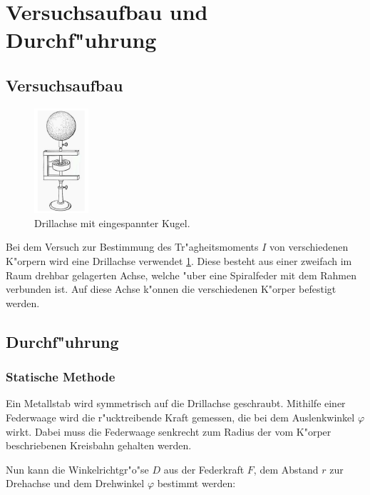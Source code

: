 \section{Versuchsaufbau und Durchf"uhrung} %
\label{sec:durchf_uhrung}

\subsection{Versuchsaufbau} %
\label{sub:aufbau}

\begin{figure}[!h]
	\centering
	\includegraphics[width = 2cm]{img/Drillachse.PNG}
	\caption{Drillachse mit eingespannter Kugel. \cite{anleitung}}
	\label{drillachse}
\end{figure}

Bei dem Versuch zur Bestimmung des Tr"agheitsmoments $I$ von verschiedenen K"orpern wird eine Drillachse verwendet \ref{drillachse}. Diese besteht aus einer zweifach im Raum drehbar gelagerten Achse, welche "uber eine Spiralfeder mit dem Rahmen verbunden ist.
Auf diese Achse k"onnen die verschiedenen K"orper befestigt werden.

\subsection{Durchf"uhrung} %
\label{sub:durchf_uhrung}

\subsubsection{Statische Methode} %
\label{sub:statische_methode}

Ein Metallstab wird symmetrisch auf die Drillachse geschraubt. 
Mithilfe einer Federwaage wird die r"ucktreibende Kraft gemessen, die bei dem Auslenkwinkel $\varphi$ wirkt.
Dabei muss die Federwaage senkrecht zum Radius der vom K"orper beschriebenen Kreisbahn gehalten werden.

Nun kann die Winkelrichtgr"o"se $D$ aus der Federkraft $F$, dem Abstand $r$ zur Drehachse und dem Drehwinkel $\varphi$ bestimmt werden:

